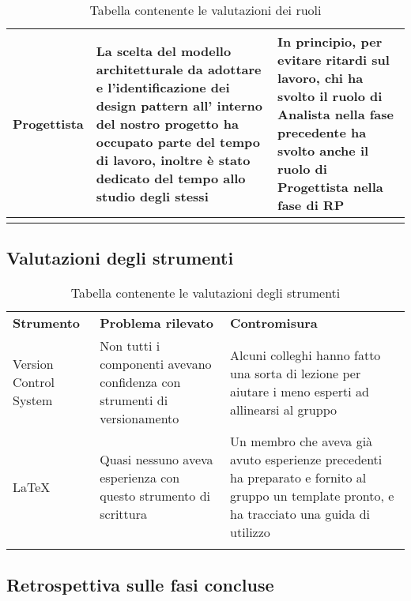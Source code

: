 \documentclass[../piano_di_qualifica.tex]{subfiles}
\begin{document}
\begin{center}
\begin{longtable}{|p{2.5cm}|p{7cm}|p{7cm}|}
		Progettista	   & La scelta del modello architetturale da adottare e l'identificazione dei design pattern all' interno del nostro progetto ha occupato parte del tempo di lavoro, inoltre è stato dedicato del tempo allo studio degli stessi & In principio, per evitare ritardi sul lavoro, chi ha svolto il ruolo di Analista nella fase precedente ha svolto anche il ruolo di Progettista nella fase di RP \\
		\hline
		\rowcolor{white}
		\caption{Tabella contenente le valutazioni dei ruoli}
	\end{longtable}
\end{center}

\subsection{Valutazioni degli strumenti}
\label{sub:valut_strumenti}

\begin{center}
	\begin{longtable}{|p{3cm}|p{4.5cm}|p{4.5cm}|}
		\hline
		\rowcolor{lightgray}
		\textbf{Strumento}                                                       & \textbf{Problema rilevato} & \textbf{Contromisura}                 \\
		Version Control System                                                   &
		Non tutti i componenti avevano confidenza con strumenti di versionamento &
		Alcuni colleghi hanno fatto una sorta di lezione per aiutare i meno esperti ad allinearsi al gruppo                                           \\
		\LaTeX                                                                   &
		Quasi nessuno aveva esperienza con questo strumento di scrittura         &
		Un membro che aveva già avuto esperienze precedenti ha preparato e fornito al gruppo un template pronto, e ha tracciato una guida di utilizzo \\
		\hline
		\rowcolor{white}
		\caption{Tabella contenente le valutazioni degli strumenti}
	\end{longtable}
\end{center}

\subsection{Retrospettiva sulle fasi concluse}
\label{sub:retrospettiva}
\end{document}
